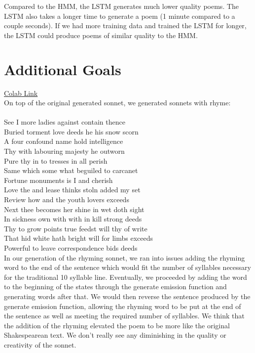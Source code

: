 \documentclass{article}
\newcommand\tab[1][1cm]{\hspace*{#1}}
\begin{document}
Compared to the HMM, the LSTM generates much lower quality poems. The LSTM also takes a longer time to generate a poem (1 minute compared to a couple seconds). If we had more training data and trained the LSTM for longer, the LSTM could produce poems of similar quality to the HMM.
\newpage


\section{Additional Goals}
\href{https://colab.research.google.com/drive/1A5OMDkiRWHaEmUsSPmJMswrTzo2o-q64?usp=sharing}{Colab Link}\\

On top of the original generated sonnet, we generated sonnets with rhyme: \\
\\
See I more ladies against contain thence \\
Buried torment love deeds he his snow scorn \\
A four confound name hold intelligence \\ 
Thy with labouring majesty he outworn \\
Pure thy in to tresses in all perish \\
Same which some what beguiled to carcanet \\
Fortune monuments is I and cherish \\ 
Love the and lease thinks stoln added my set \\
Review how and the youth lovers exceeds \\ 
Next thee becomes her shine in wet doth sight \\ 
In sickness own with with in kill strong deeds \\
Thy to grow points true feedst will thy of write \\
\tab That hid white hath bright will for limbs exceeds \\
\tab Powerful to leave correspondence bids deeds \\

In our generation of the rhyming sonnet, we ran into issues adding the rhyming word to the end of the sentence which would fit the number of syllables necessary for the traditional 10 syllable line. Eventually, we proceeded by adding the word to the beginning of the states through the generate emission function and generating words after that. We would then reverse the sentence produced by the generate emission function, allowing the rhyming word to be put at the end of the sentence as well as meeting the required number of syllables. We think that the addition of the rhyming elevated the poem to be more like the original Shakespearean text. We don't really see any diminishing in the quality or creativity of the sonnet.
\end{document}
